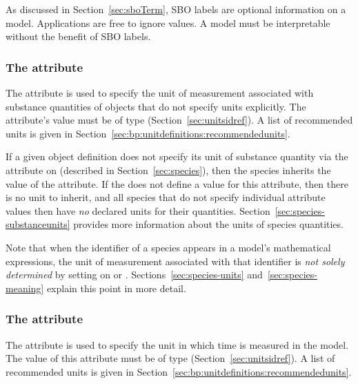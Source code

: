 As discussed in Section~\ref{sec:sboTerm}, SBO labels are optional
information on a model.  Applications are free to ignore
 values.  A model must be interpretable without the
benefit of SBO labels.


\subsubsection{The  attribute}
\label{sec:model-substanceUnits}
\label{sec:substanceunits}

The  attribute is used to specify the unit
of measurement associated with substance quantities of \Species
objects that do not specify units explicitly.  The attribute's
value must be of type 
(Section~\ref{sec:unitsidref}).  A list of recommended units is
given in Section~\ref{sec:bp:unitdefinitions:recommendedunits}.

If a given \Species object definition does not specify its unit of
substance quantity via the  attribute on
\Species (described in Section~\ref{sec:species}), then the
species inherits the value of the \Model {}
attribute.  If the \Model does not define a value for this
attribute, then there is no unit to inherit, and all species that
do not specify individual  attribute values
then have \emph{no} declared units for their quantities.
Section~\ref{sec:species-substanceunits} provides more information
about the units of species quantities.

Note that when the identifier of a species appears in a model's
mathematical expressions, the unit of measurement associated with
that identifier is \emph{not solely determined} by setting
 on \Model or \Species.
Sections~\ref{sec:species-units} and~\ref{sec:species-meaning}
explain this point in more detail.


\subsubsection{The  attribute}
\label{sec:model-timeUnits}
\label{sec:timeunits}

The  attribute is used to specify the unit in
which time is measured in the model.  The value of this attribute
must be of type 
(Section~\ref{sec:unitsidref}).  A list of recommended units is
given in Section~\ref{sec:bp:unitdefinitions:recommendedunits}.

